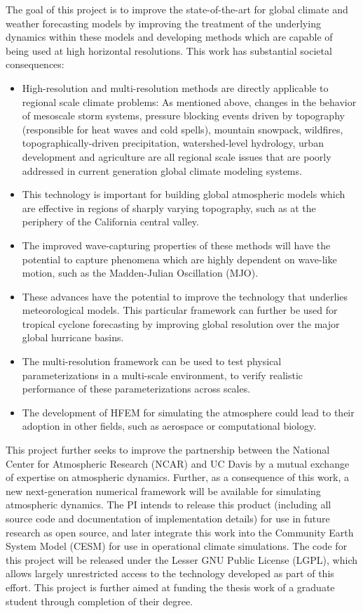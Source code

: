 \documentclass[11pt]{article}
\begin{document}
The goal of this project is to improve the state-of-the-art for global climate and weather forecasting models by improving the treatment of the underlying dynamics within these models and developing methods which are capable of being used at high horizontal resolutions.  This work has substantial societal consequences:
\vspace{-0.4cm}
\begin{itemize}
\item High-resolution and multi-resolution methods are directly applicable to regional scale climate problems: As mentioned above, changes in the behavior of mesoscale storm systems, pressure blocking events driven by topography (responsible for heat waves and cold spells), mountain snowpack, wildfires, topographically-driven precipitation, watershed-level hydrology, urban development and agriculture are all regional scale issues that are poorly addressed in current generation global climate modeling systems.
\item This technology is important for building global atmospheric models which are effective in regions of sharply varying topography, such as at the periphery of the California central valley.
\item The improved wave-capturing properties of these methods will have the potential to capture phenomena which are highly dependent on wave-like motion, such as the Madden-Julian Oscillation (MJO).
\item These advances have the potential to improve the technology that underlies meteorological models.  This particular framework can further be used for tropical cyclone forecasting by improving global resolution over the major global hurricane basins.
\item The multi-resolution framework can be used to test physical parameterizations in a multi-scale environment, to verify realistic performance of these parameterizations across scales.
\item The development of HFEM for simulating the atmosphere could lead to their adoption in other fields, such as aerospace or computational biology.
\end{itemize}
\vspace{-0.4cm}
This project further seeks to improve the partnership between the National Center for Atmospheric Research (NCAR) and UC Davis by a mutual exchange of expertise on atmospheric dynamics.  Further, as a consequence of this work, a new next-generation numerical framework will be available for simulating atmospheric dynamics.  The PI intends to release this product (including all source code and documentation of implementation details) for use in future research as open source, and later integrate this work into the Community Earth System Model (CESM) \citep{JWHetal2013BAMS} for use in operational climate simulations.  The code for this project will be released under the Lesser GNU Public License (LGPL), which allows largely unrestricted access to the technology developed as part of this effort.  This project is further aimed at funding the thesis work of a graduate student through completion of their degree.
\end{document}
